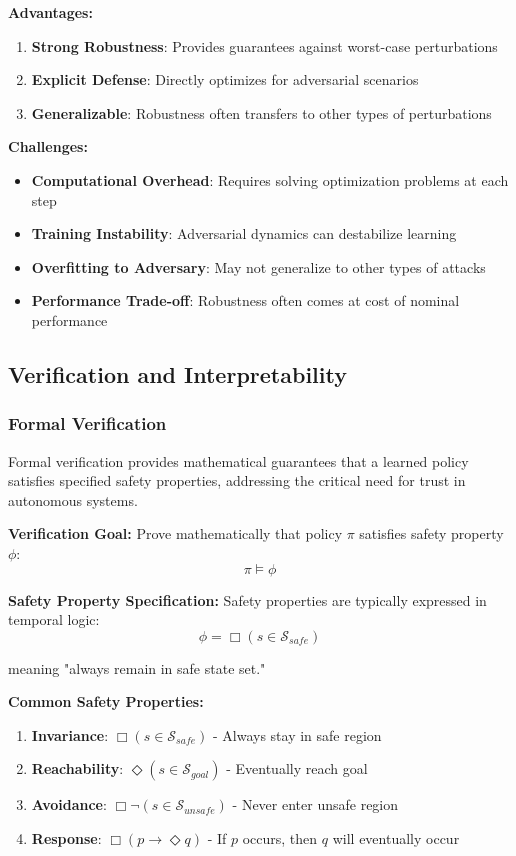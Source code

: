 \documentclass[12pt]{article}
\begin{document}
{{{{\textbf{Advantages:}
\begin{enumerate}
\item \textbf{Strong Robustness}: Provides guarantees against worst-case perturbations
\item \textbf{Explicit Defense}: Directly optimizes for adversarial scenarios
\item \textbf{Generalizable}: Robustness often transfers to other types of perturbations
\end{enumerate}

\textbf{Challenges:}
\begin{itemize}
\item \textbf{Computational Overhead}: Requires solving optimization problems at each step
\item \textbf{Training Instability}: Adversarial dynamics can destabilize learning
\item \textbf{Overfitting to Adversary}: May not generalize to other types of attacks
\item \textbf{Performance Trade-off}: Robustness often comes at cost of nominal performance
\end{itemize}

\subsection{Verification and Interpretability}

\subsubsection{Formal Verification}

Formal verification provides mathematical guarantees that a learned policy satisfies specified safety properties, addressing the critical need for trust in autonomous systems.

\textbf{Verification Goal:}
Prove mathematically that policy $\pi$ satisfies safety property $\phi$:
\begin{equation}
\pi \models \phi
\end{equation}

\textbf{Safety Property Specification:}
Safety properties are typically expressed in temporal logic:
\begin{equation}
\phi = \Box(s \in \mathcal{S}_{safe})
\end{equation}

meaning "always remain in safe state set."

\textbf{Common Safety Properties:}
\begin{enumerate}
\item \textbf{Invariance}: $\Box(s \in \mathcal{S}_{safe})$ - Always stay in safe region
\item \textbf{Reachability}: $\Diamond(s \in \mathcal{S}_{goal})$ - Eventually reach goal
\item \textbf{Avoidance}: $\Box \neg(s \in \mathcal{S}_{unsafe})$ - Never enter unsafe region
\item \textbf{Response}: $\Box(p \rightarrow \Diamond q)$ - If $p$ occurs, then $q$ will eventually occur
\end{enumerate}

}}}}
\end{document}
